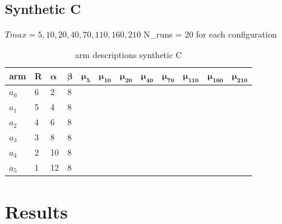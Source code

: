 \subsection{Synthetic C}

$Tmax = 5, 10, 20, 40, 70, 110, 160, 210$
N\_runs = 20 for each configuration

\begin{table}[H]
	\centering
	\caption{arm descriptions synthetic C}
	\begin{tabular}{|l||l|l|l|l|l|l|l|l|l|l|l|} 
		\hline
		\textbf{arm} & \textbf{R} & $\boldsymbol{\alpha}$ & $\boldsymbol{\beta}$ & $\boldsymbol{\mu_5}$ & $\boldsymbol{\mu_{10}}$ & $\boldsymbol{\mu_{20}}$ & $\boldsymbol{\mu_{40}}$ & $\boldsymbol{\mu_{70}}$ & $\boldsymbol{\mu_{110}}$& $\boldsymbol{\mu_{160}}$& $\boldsymbol{\mu_{210}}$ \\ 
		\hline
		$a_0$     & 6          & 2        & 8       &    & & & & & & &                \\ 
		\hline
		$a_1$     & 5          & 4        & 8       &    & & & & & & &                   \\ 
		\hline
		$a_2$     & 4          & 6        & 8       &          & & & & & & &           \\ 
		\hline
		$a_3$     & 3          & 8        & 8       &                 & & & & & & &     \\ 
		\hline
		$a_4$     & 2          & 10        & 8       & & & & & & & &                  \\ 
		\hline
		${a_5}$     & 1          & 12        & 8       &      & & & & &  &&                \\                 
		\hline
	\end{tabular}
\end{table}

\section{Results}

